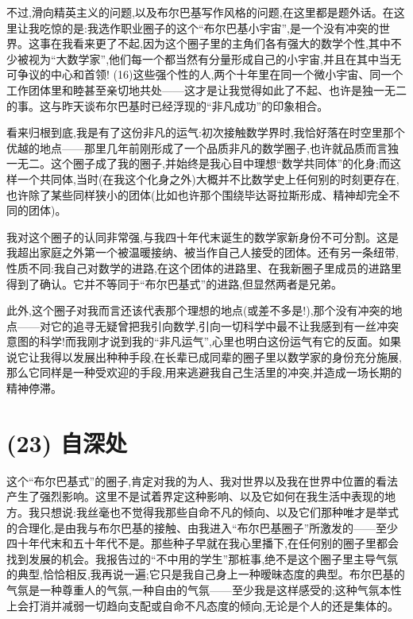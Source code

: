 不过,滑向精英主义的问题,以及布尔巴基写作风格的问题,在这里都是题外话。在这里让我吃惊的是:我选作职业圈子的这个“布尔巴基小宇宙”,是一个没有冲突的世界。这事在我看来更了不起,因为这个圈子里的主角们各有强大的数学个性,其中不少被视为“大数学家”,他们每一个都当然有分量形成自己的小宇宙,并且在其中当无可争议的中心和首领! (16)这些强个性的人,两个十年里在同一个微小宇宙、同一个工作团体里和睦甚至亲切地共处——这才是让我觉得如此了不起、也许是独一无二的事。这与昨天谈布尔巴基时已经浮现的“非凡成功”的印象相合。

看来归根到底,我是有了这份非凡的运气:初次接触数学界时,我恰好落在时空里那个优越的地点——那里几年前刚形成了一个品质非凡的数学圈子,也许就品质而言独一无二。这个圈子成了我的圈子,并始终是我心目中理想“数学共同体”的化身;而这样一个共同体,当时(在我这个化身之外)大概并不比数学史上任何别的时刻更存在,也许除了某些同样狭小的团体(比如也许那个围绕毕达哥拉斯形成、精神却完全不同的团体)。

我对这个圈子的认同非常强,与我四十年代末诞生的数学家新身份不可分割。这是我超出家庭之外第一个被温暖接纳、被当作自己人接受的团体。还有另一条纽带,性质不同:我自己对数学的进路,在这个团体的进路里、在我新圈子里成员的进路里得到了确认。它并不等同于“布尔巴基式”的进路,但显然两者是兄弟。

此外,这个圈子对我而言还该代表那个理想的地点(或差不多是!),那个没有冲突的地点——对它的追寻无疑曾把我引向数学,引向一切科学中最不让我感到有一丝冲突意图的科学!而我刚才说到我的“非凡运气”,心里也明白这份运气有它的反面。如果说它让我得以发展出种种手段,在长辈已成同辈的圈子里以数学家的身份充分施展,那么它同样是一种受欢迎的手段,用来逃避我自己生活里的冲突,并造成一场长期的精神停滞。

\section{(23) 自深处}

这个“布尔巴基式”的圈子,肯定对我的为人、我对世界以及我在世界中位置的看法产生了强烈影响。这里不是试着界定这种影响、以及它如何在我生活中表现的地方。我只想说:我丝毫也不觉得我那些自命不凡的倾向、以及它们那种唯才是举式的合理化,是由我与布尔巴基的接触、由我进入“布尔巴基圈子”所激发的——至少四十年代末和五十年代不是。那些种子早就在我心里播下,在任何别的圈子里都会找到发展的机会。我报告过的“不中用的学生”那桩事,绝不是这个圈子里主导气氛的典型,恰恰相反,我再说一遍;它只是我自己身上一种暧昧态度的典型。布尔巴基的气氛是一种尊重人的气氛,一种自由的气氛——至少我是这样感受的;这种气氛本性上会打消并减弱一切趋向支配或自命不凡态度的倾向,无论是个人的还是集体的。

